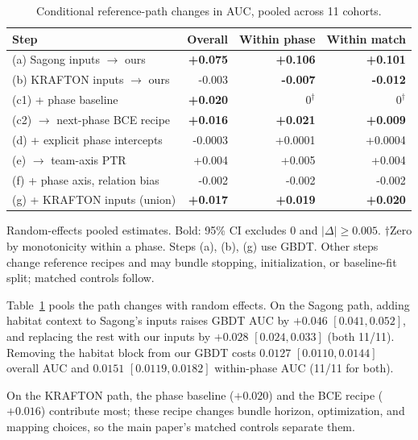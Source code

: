 \documentclass[sigconf,anonymous,nonacm]{acmart}
\begin{document}
\begin{table}[t]
\centering\footnotesize
\caption{Conditional reference-path changes in AUC, pooled across 11 cohorts.}
\label{tab:steps}
\setlength{\tabcolsep}{3pt}
\begin{tabular}{lrrr}
\toprule
Step & Overall & Within phase & Within match \\
\midrule
(a) Sagong inputs $\to$ ours & \textbf{+0.075} & \textbf{+0.106} & \textbf{+0.101} \\
(b) KRAFTON inputs $\to$ ours & -0.003 & \textbf{-0.007} & \textbf{-0.012} \\
(c1) + phase baseline & \textbf{+0.020} & $0^{\dagger}$ & $0^{\dagger}$ \\
(c2) $\to$ next-phase BCE recipe & \textbf{+0.016} & \textbf{+0.021} & \textbf{+0.009} \\
(d) + explicit phase intercepts & -0.0003 & +0.0001 & +0.0004 \\
(e) $\to$ team-axis PTR & +0.004 & +0.005 & +0.004 \\
(f) + phase axis, relation bias & -0.002 & -0.002 & -0.002 \\
(g) + KRAFTON inputs (union) & \textbf{+0.017} & \textbf{+0.019} & \textbf{+0.020} \\
\bottomrule
\end{tabular}
\smallskip
\parbox{\columnwidth}{\scriptsize Random-effects pooled estimates. Bold: 95\% CI excludes 0 and $|\Delta|\geq0.005$. $\dagger$Zero by monotonicity within a phase. Steps (a), (b), (g) use GBDT. Other steps change reference recipes and may bundle stopping, initialization, or baseline-fit split; matched controls follow.}
\end{table}

Table~\ref{tab:steps} pools the path changes with random effects. On the Sagong path, adding habitat context to Sagong's inputs raises GBDT AUC by $+0.046$ $[0.041,\allowbreak 0.052]$, and replacing the rest with our inputs by $+0.028$ $[0.024,\allowbreak 0.033]$ (both 11/11). Removing the habitat block from our GBDT costs $0.0127$ $[0.0110,\allowbreak 0.0144]$ overall AUC and $0.0151$ $[0.0119,\allowbreak 0.0182]$ within-phase AUC (11/11 for both).

On the KRAFTON path, the phase baseline ($+0.020$) and the BCE recipe ($+0.016$) contribute most; these recipe changes bundle horizon, optimization, and mapping choices, so the main paper's matched controls separate them.
\end{document}
